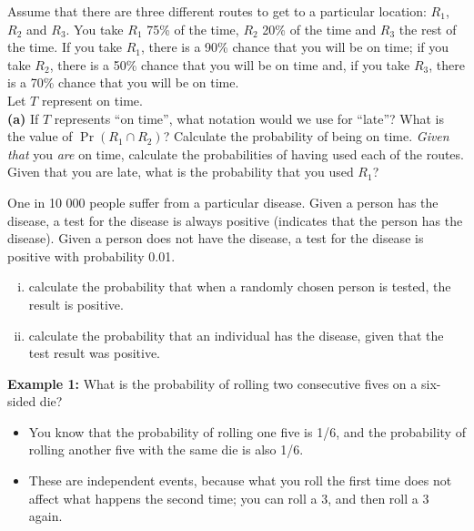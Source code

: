 \item 
Assume that there are three different routes to get to a particular location: $R_1$, $R_2$ and $R_3$. You take $R_1$ 75\% of the time, $R_2$ 20\% of the time and $R_3$ the rest of the time. If you take $R_1$, there is a 90\% chance that you will be on time; if you take $R_2$, there is a 50\% chance that you will be on time and, if you take $R_3$, there is a 70\% chance that you will be on time. \\[0.1cm]
Let $T$ represent on time.\\[-0.2cm]

{\bf(a)} If $T$ represents ``on time'', what notation would we use for ``late''?  What is the value of $\Pr(R_1 \cap R_2)$?  Calculate the probability of being on time.  \emph{Given that} you \emph{are} on time, calculate the probabilities of having used each of the routes.  Given that you are late, what is the probability that you used $R_1$?

\item One in 10 000 people suffer from a particular disease. Given a person has the disease, a test for the disease is always positive (indicates that the person has the disease). Given a person does not have the disease, a test for the disease is positive with probability 0.01.
\begin{enumerate}[(i)]
\item calculate the probability that when a randomly chosen person is tested, the result is positive. 
\item calculate the probability that an individual has the disease, given that the test result was positive.
\end{enumerate}

\item \textbf{Example 1:} What is the probability of rolling two consecutive fives on a six-sided die?
\begin{itemize}
\item You know that the probability of rolling one five is 1/6, and the probability of rolling another five with the same die is also 1/6.
\item These are independent events, because what you roll the first time does not affect what happens the second time; you can roll a 3, and then roll a 3 again.
\end{itemize}

